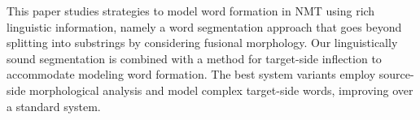 This paper studies strategies to model word formation in NMT using rich linguistic information, namely a word segmentation approach that goes beyond splitting into substrings by considering fusional morphology. Our linguistically sound segmentation is combined with a method for target-side inflection to accommodate modeling word formation. The best system variants employ source-side morphological analysis and model complex target-side words, improving over a standard system.
